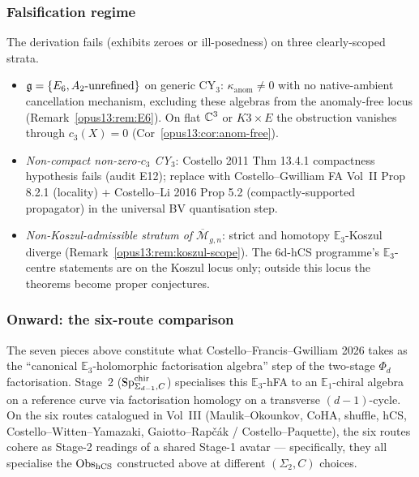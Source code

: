 \subsubsection{Falsification regime}

The derivation fails (exhibits zeroes or ill-posedness) on three
clearly-scoped strata.

\begin{itemize}
\item \emph{$\mathfrak{g} = \{E_6, A_2\text{-unrefined}\}$} on generic CY$_3$:
  $\kappa_{\mathrm{anom}} \neq 0$ with no native-ambient cancellation
  mechanism, excluding these algebras from the
  anomaly-free locus (Remark~\ref{opus13:rem:E6}). On flat $\mathbb{C}^3$ or
  $K3\times E$ the obstruction vanishes through $c_3(X) = 0$
  (Cor~\ref{opus13:cor:anom-free}).
\item \emph{Non-compact non-zero-$c_3$ CY$_3$}:
  Costello 2011 Thm 13.4.1 compactness hypothesis fails
  (audit E12); replace with Costello--Gwilliam FA Vol~II Prop 8.2.1
  (locality) + Costello--Li 2016 Prop 5.2 (compactly-supported
  propagator) in the universal BV quantisation step.
\item \emph{Non-Koszul-admissible stratum of $\overline{\mathcal M}_{g,n}$}:
  strict and homotopy $\mathbb E_3$-Koszul diverge
  (Remark~\ref{opus13:rem:koszul-scope}). The 6d-hCS programme's
  $\mathbb E_3$-centre statements are on the Koszul locus only; outside
  this locus the theorems become proper conjectures.
\end{itemize}

\subsubsection{Onward: the six-route comparison}

The seven pieces above constitute what Costello--Francis--Gwilliam 2026
takes as the ``canonical $\mathbb E_3$-holomorphic factorisation algebra''
step of the two-stage $\Phi_d$ factorisation. Stage~2
($\mathrm{Sp}^{\mathrm{chir}}_{\Sigma_{d-1},C}$) specialises this
$\mathbb E_3$-hFA to an $\mathbb E_1$-chiral algebra on a reference curve
via factorisation homology on a transverse $(d-1)$-cycle. On the six
routes catalogued in Vol~III (Maulik--Okounkov, CoHA, shuffle, hCS,
Costello--Witten--Yamazaki, Gaiotto--Rapčák / Costello--Paquette), the
six routes cohere as Stage-2 readings of a shared Stage-1 avatar —
specifically, they all specialise the $\mathrm{Obs}_{\mathrm{hCS}}$ constructed above
at different $(\Sigma_2, C)$ choices.

